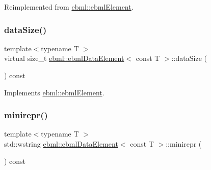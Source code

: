 Reimplemented from \mbox{\hyperlink{classebml_1_1ebmlElement_a15cf59e94b01e2c49ec96512b9bd9d90}{ebml\+::ebml\+Element}}.

\mbox{\label{classebml_1_1ebmlDataElement_3_01const_01T_01_4_a0965d2da67f1862d2c806151063dcfce}} 
\subsubsection{\texorpdfstring{data\+Size()}{dataSize()}}
{\footnotesize\ttfamily template$<$typename T $>$ \\
virtual size\+\_\+t \mbox{\hyperlink{classebml_1_1ebmlDataElement}{ebml\+::ebml\+Data\+Element}}$<$ const T $>$\+::data\+Size (\begin{DoxyParamCaption}{ }\end{DoxyParamCaption}) const\hspace{0.3cm}{\ttfamily [virtual]}}



Implements \mbox{\hyperlink{classebml_1_1ebmlElement_a47ed4167d9c69104e02b6dbad0cd1fef}{ebml\+::ebml\+Element}}.

\mbox{\label{classebml_1_1ebmlDataElement_3_01const_01T_01_4_aa5a82c4528609bf788caf8db8927fbc1}} 
\subsubsection{\texorpdfstring{minirepr()}{minirepr()}}
{\footnotesize\ttfamily template$<$typename T $>$ \\
std\+::wstring \mbox{\hyperlink{classebml_1_1ebmlDataElement}{ebml\+::ebml\+Data\+Element}}$<$ const T $>$\+::minirepr (\begin{DoxyParamCaption}{ }\end{DoxyParamCaption}) const\hspace{0.3cm}{\ttfamily [virtual]}}



